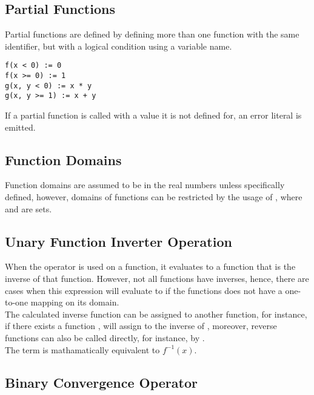 \documentclass[11pt,a4paper]{book}
\begin{document}
\subsection{Partial Functions}

Partial functions are defined by defining more than one function with the same identifier, but with a logical condition using a variable name.

\begin{lstlisting}
f(x < 0) := 0
f(x >= 0) := 1
g(x, y < 0) := x * y
g(x, y >= 1) := x + y 
\end{lstlisting}

If a partial function is called with a value it is not defined for, an  error literal is emitted.

\subsection{Function Domains}

Function domains are assumed to be in the real numbers unless specifically defined, however, domains of functions can be restricted by the usage of , where  and  are sets. \\

\subsection{Unary Function Inverter Operation \code{\textbackslash}}

When the operator \code{\textbackslash} is used on a function, it evaluates to a function that is the inverse of that function. However, not all functions have inverses, hence, there are cases when this expression will evaluate to  if the functions does not have a one-to-one mapping on its domain. \\

The calculated inverse function can be assigned to another function, for instance, if there exists a function ,  will assign  to the inverse of , moreover, reverse functions can also be called directly, for instance, by . \\

The term  is mathamatically equivalent to $f^{-1}(x)$.

\subsection{Binary Convergence Operator \code{->}}
\end{document}
